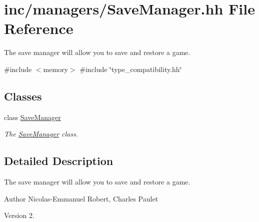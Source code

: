 \hypertarget{SaveManager_8hh}{}\section{inc/managers/\+Save\+Manager.hh File Reference}
\label{SaveManager_8hh}


The save manager will allow you to save and restore a game.  


{\ttfamily \#include $<$memory$>$}\newline
{\ttfamily \#include \char`\"{}type\+\_\+compatibility.\+hh\char`\"{}}\newline
\subsection*{Classes}
\begin{DoxyCompactItemize}
\item 
class \hyperlink{classSaveManager}{Save\+Manager}
\begin{DoxyCompactList}\small\item\em The \hyperlink{classSaveManager}{Save\+Manager} class. \end{DoxyCompactList}\end{DoxyCompactItemize}


\subsection{Detailed Description}
The save manager will allow you to save and restore a game. 

\begin{DoxyAuthor}{Author}
Nicolas-\/\+Emmanuel Robert, Charles Paulet 
\end{DoxyAuthor}
\begin{DoxyVersion}{Version}
2. 
\end{DoxyVersion}
